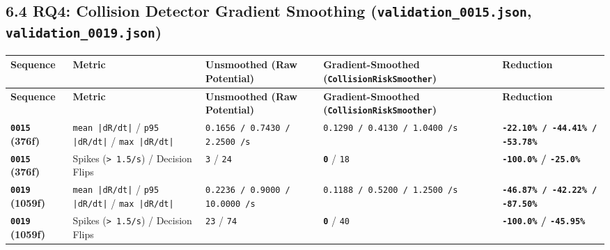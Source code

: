 \documentclass[10.5pt,a4paper]{article}
\begin{document}
\subsection{6.4 RQ4: Collision Detector Gradient Smoothing (\texttt{validation\_\allowbreak{}0015.\allowbreak{}json}, \texttt{validation\_\allowbreak{}0019.\allowbreak{}json})}

\begin{footnotesize}
\setlength{\tabcolsep}{4pt}
\setlength{\LTleft}{0pt}\setlength{\LTright}{0pt}
\begin{longtable}{>{\raggedright\arraybackslash}p{} >{\raggedright\arraybackslash}p{} >{\raggedright\arraybackslash}p{} >{\raggedright\arraybackslash}p{} >{\raggedright\arraybackslash}p{}}
\toprule
\textbf{Sequence} & \textbf{Metric} & \textbf{Unsmoothed (Raw Potential)} & \textbf{Gradient-Smoothed (\texttt{CollisionRiskSmoother})} & \textbf{Reduction} \\
\midrule
\endfirsthead
\toprule
\textbf{Sequence} & \textbf{Metric} & \textbf{Unsmoothed (Raw Potential)} & \textbf{Gradient-Smoothed (\texttt{CollisionRiskSmoother})} & \textbf{Reduction} \\
\midrule
\endhead
\bottomrule
\endfoot
\textbf{\texttt{0015} (376f)} & \texttt{mean |dR/\allowbreak{}dt|} / \texttt{p95 |dR/\allowbreak{}dt|} / \texttt{max |dR/\allowbreak{}dt|} & \texttt{0.\allowbreak{}1656 /\allowbreak{} 0.\allowbreak{}7430 /\allowbreak{} 2.\allowbreak{}2500 /\allowbreak{}s} & \texttt{0.\allowbreak{}1290 /\allowbreak{} 0.\allowbreak{}4130 /\allowbreak{} 1.\allowbreak{}0400 /\allowbreak{}s} & \textbf{\texttt{-\allowbreak{}22.\allowbreak{}10\% /\allowbreak{} -\allowbreak{}44.\allowbreak{}41\% /\allowbreak{} -\allowbreak{}53.\allowbreak{}78\%}} \\
\textbf{\texttt{0015} (376f)} & Spikes (\texttt{> 1.\allowbreak{}5/\allowbreak{}s}) / Decision Flips & \texttt{3} / \texttt{24} & \textbf{\texttt{0}} / \texttt{18} & \textbf{\texttt{-\allowbreak{}100.\allowbreak{}0\%} / \texttt{-\allowbreak{}25.\allowbreak{}0\%}} \\
\textbf{\texttt{0019} (1059f)} & \texttt{mean |dR/\allowbreak{}dt|} / \texttt{p95 |dR/\allowbreak{}dt|} / \texttt{max |dR/\allowbreak{}dt|} & \texttt{0.\allowbreak{}2236 /\allowbreak{} 0.\allowbreak{}9000 /\allowbreak{} 10.\allowbreak{}0000 /\allowbreak{}s} & \texttt{0.\allowbreak{}1188 /\allowbreak{} 0.\allowbreak{}5200 /\allowbreak{} 1.\allowbreak{}2500 /\allowbreak{}s} & \textbf{\texttt{-\allowbreak{}46.\allowbreak{}87\% /\allowbreak{} -\allowbreak{}42.\allowbreak{}22\% /\allowbreak{} -\allowbreak{}87.\allowbreak{}50\%}} \\
\textbf{\texttt{0019} (1059f)} & Spikes (\texttt{> 1.\allowbreak{}5/\allowbreak{}s}) / Decision Flips & \texttt{23} / \texttt{74} & \textbf{\texttt{0}} / \texttt{40} & \textbf{\texttt{-\allowbreak{}100.\allowbreak{}0\%} / \texttt{-\allowbreak{}45.\allowbreak{}95\%}} \\
\end{longtable}
\end{footnotesize}
\end{document}
